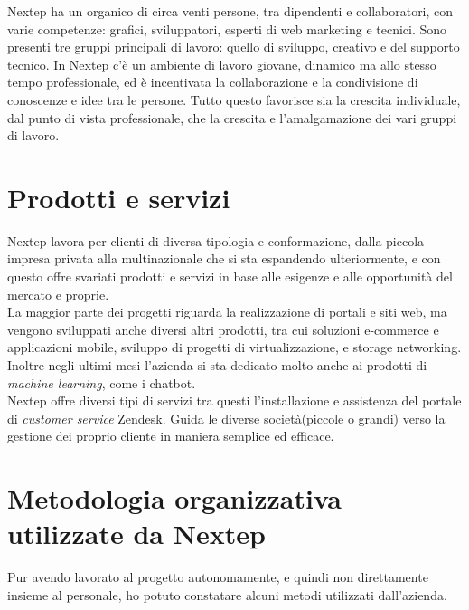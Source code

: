 Nextep ha un organico di circa venti persone, tra dipendenti e collaboratori, con
varie competenze: grafici, sviluppatori, esperti di web marketing e tecnici. Sono presenti
tre gruppi principali di lavoro: quello di sviluppo, creativo e del supporto
tecnico.
In Nextep c’è un ambiente di lavoro giovane, dinamico ma allo stesso tempo professionale,
ed è incentivata la collaborazione e la condivisione di conoscenze e idee
tra le persone. Tutto questo favorisce sia la crescita individuale, dal punto di vista
professionale, che la crescita e l’amalgamazione dei vari gruppi di lavoro.

\section{Prodotti e servizi}
Nextep lavora per clienti di diversa tipologia e conformazione, dalla piccola impresa
privata alla multinazionale che si sta espandendo ulteriormente, e con questo offre
svariati prodotti e servizi in base alle esigenze e alle opportunità del mercato e proprie. 
\\

La maggior parte dei progetti riguarda la realizzazione di portali e siti web, ma vengono
sviluppati anche diversi altri prodotti, tra cui soluzioni e-commerce e applicazioni
mobile, sviluppo di progetti di virtualizzazione, e storage networking. Inoltre negli ultimi mesi l'azienda si sta dedicato molto anche ai prodotti di \emph{machine learning}, come i chatbot. \\

Nextep offre diversi tipi di servizi tra questi l'installazione e assistenza del portale di \emph{customer service} Zendesk. Guida le diverse società(piccole o grandi) verso la gestione dei proprio cliente in maniera semplice ed efficace. 

\section{Metodologia organizzativa utilizzate da Nextep}
Pur avendo lavorato al progetto autonomamente, e quindi non direttamente insieme
al personale, ho potuto constatare alcuni metodi utilizzati
dall’azienda. 
\\
 
